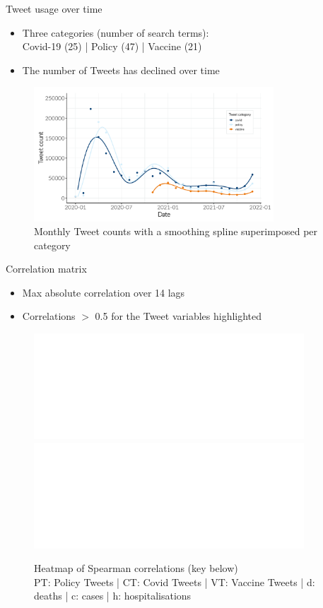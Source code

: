\documentclass{beamer}
\begin{document}
\begin{frame}{Tweet usage over time}
  \begin{itemize}
  \item Three categories (number of search terms): \\ Covid-19 (25) | Policy
    (47) | Vaccine (21) \\[5pt]
  \item The number of Tweets has declined over time
  \end{itemize}
  \begin{figure}[!ht]
    \centering
    \includegraphics[width=0.8\textwidth]{figures/smoothing_spline_trend.pdf}
    \caption{Monthly Tweet counts with a smoothing spline superimposed per category}
  \end{figure} 
\end{frame}

\begin{frame}{Correlation matrix} 
  \begin{itemize}
  \item Max absolute correlation over 14 lags
  \item Correlations $>$ 0.5 for the Tweet variables highlighted
  \end{itemize}
 
  \begin{figure}[!ht]
    \centering
    \includegraphics<1>[width=0.9\textwidth]{figures/rrs_heatmap_formatted_wave2.pdf}%
    \includegraphics<2>[width=0.9\textwidth]{figures/rrs_heatmap_formatted_wave2_recs.pdf} 
    \caption{Heatmap of Spearman correlations (key below)\\PT: Policy Tweets | CT: Covid Tweets | VT: Vaccine Tweets | d: deaths | c: cases | h: hospitalisations}
  \end{figure} 
\end{frame}
\end{document}

